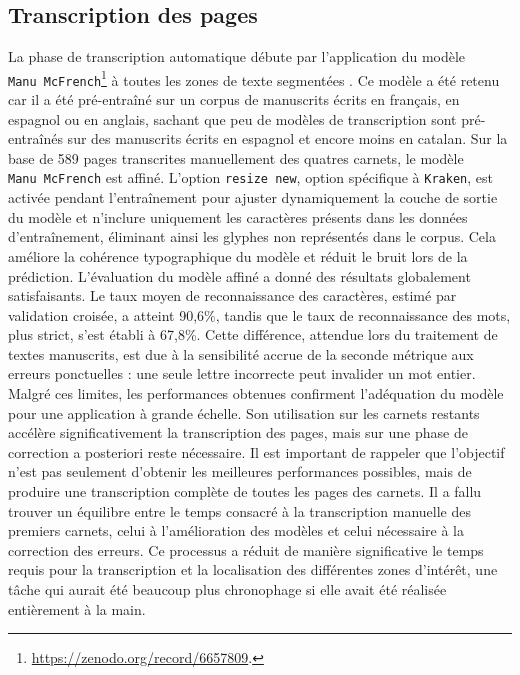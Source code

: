 \documentclass[final, fra]{anthology-ch}     %
\begin{document}
\subsection{Transcription des pages}
La phase de transcription automatique débute par l’application du modèle \texttt{Manu~McFrench}\footnote{\url{https://zenodo.org/record/6657809}.} à toutes les zones de texte segmentées \cite{chague2023}. Ce modèle a été retenu car il a été pré-entraîné sur un corpus de manuscrits écrits en français, en espagnol ou en anglais, sachant que peu de modèles de transcription sont pré-entraînés sur des manuscrits écrits en espagnol et encore moins en catalan.
Sur la base de 589 pages transcrites manuellement des quatres carnets, le modèle \texttt{Manu~McFrench} est affiné. L’option \texttt{resize new}, option spécifique à \texttt{Kraken}, est activée pendant l’entraînement pour ajuster dynamiquement la couche de sortie du modèle et n'inclure uniquement les caractères présents dans les données d’entraînement, éliminant ainsi les glyphes non représentés dans le corpus. Cela améliore la cohérence typographique du modèle et réduit le bruit lors de la prédiction.
L’évaluation du modèle affiné a donné des résultats globalement satisfaisants. Le taux moyen de reconnaissance des caractères, estimé par  validation croisée, a atteint 90,6\%, tandis que le taux de reconnaissance des mots, plus strict, s’est établi à 67,8\%. Cette différence, attendue lors du traitement de textes manuscrits, est due à la sensibilité accrue de la seconde métrique aux erreurs ponctuelles : une seule lettre incorrecte peut invalider un mot entier. Malgré ces limites, les performances obtenues confirment l’adéquation du modèle pour une application à grande échelle. Son utilisation sur les carnets restants accélère significativement la transcription des pages, mais sur une phase de correction a posteriori reste nécessaire. 
Il est important de rappeler que l’objectif n’est pas seulement d’obtenir les meilleures performances possibles, mais de produire une transcription complète de toutes les pages des carnets. Il a fallu trouver un équilibre entre le temps consacré à la transcription manuelle des premiers carnets, celui à l’amélioration des modèles et celui nécessaire à la correction des erreurs. Ce processus a réduit de manière significative le temps requis pour la transcription et la localisation des différentes zones d’intérêt, une tâche qui aurait été beaucoup plus chronophage si elle avait été réalisée entièrement à la main.
\end{document}
